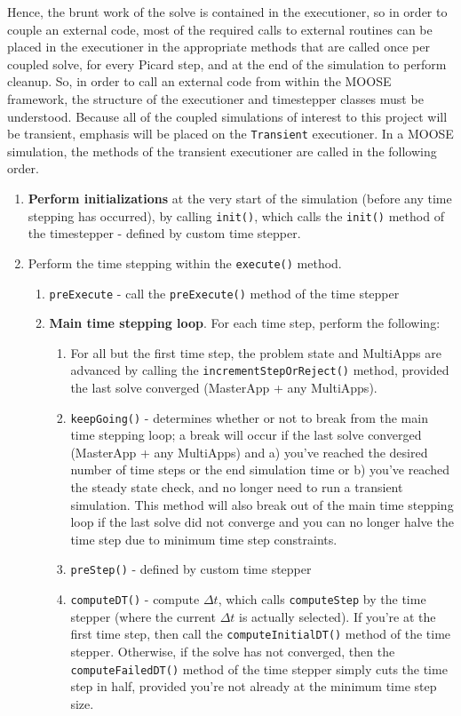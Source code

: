 \documentclass[10pt]{article}
\numberwithin{equation}{section} %
\begin{document}
Hence, the brunt work of the solve is contained in the executioner, so in order to couple an external code, most of the required calls to external routines can be placed in the executioner in the appropriate methods that are called once per coupled solve, for every Picard step, and at the end of the simulation to perform cleanup. So, in order to call an external code from within the MOOSE framework, the structure of the executioner and timestepper classes must be understood. Because all of the coupled simulations of interest to this project will be transient, emphasis will be placed on the {\tt Transient} executioner. In a MOOSE simulation, the methods of the transient executioner are called in the following order. 

\begin{enumerate}
\item {\bf Perform initializations} at the very start of the simulation (before any time stepping has occurred), by calling {\tt init()}, which calls the {\tt init()} method of the timestepper - defined by custom time stepper. 
\item Perform the time stepping within the {\tt execute()} method.
	\begin{enumerate}
	\item {\tt preExecute} - call the {\tt preExecute()} method of the time stepper%
	\item {\bf Main time stepping loop}. For each time step, perform the following:
		\begin{enumerate}
		\item For all but the first time step, the problem state and MultiApps are advanced by calling the {\tt incrementStepOrReject()} method, provided the last solve converged (MasterApp + any MultiApps).
		\item {\tt keepGoing()} - determines whether or not to break from the main time stepping loop; a break will occur if the last solve converged (MasterApp + any MultiApps) and a) you've reached the desired number of time steps or the end simulation time or b) you've reached the steady state check, and no longer need to run a transient simulation. This method will also break out of the main time stepping loop if the last solve did not converge and you can no longer halve the time step due to minimum time step constraints.
		\item {\tt preStep()}  - defined by custom time stepper
		\item {\tt computeDT()} - compute \(\Delta t\), which calls {\tt computeStep} by the time stepper (where the current \(\Delta t\) is actually selected). If you're at the first time step, then call the {\tt computeInitialDT()} method of the time stepper. Otherwise, if the solve has not converged, then the {\tt computeFailedDT()}  method of the time stepper simply cuts the time step in half, provided you're not already at the minimum time step size.

\end{enumerate}
\end{enumerate}
\end{enumerate}
\end{document}
